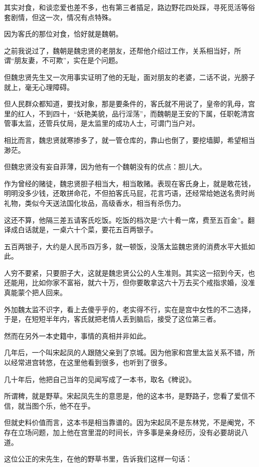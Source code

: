 \begin{multicols}{\theparacolNo}
其实对食，和谈恋爱也差不多，也有第三者插足，路边野花四处踩，寻死觅活等俗套剧情，但这一次，情况有点特殊。

因为客氏的那位对食，恰好就是魏朝。

之前我说过了，魏朝是魏忠贤的老朋友，还帮他介绍过工作，关系相当好，所谓“朋友妻，不可欺”，实在是个问题。

但魏忠贤先生又一次用事实证明了他的无耻，面对朋友的老婆，二话不说，光膀子就上，毫无心理障碍。

但人民群众都知道，要找对象，那是要条件的，客氏就不用说了，皇帝的乳母，宫里的红人，不到四十，“妖艳美貌，品行淫荡”，而魏朝是王安的下属，任职乾清宫管事太监，还管兵仗局，是太监里的成功人士，可谓门当户对。

相比而言，魏忠贤就寒掺多了，就一管仓库的，靠山也倒了，要挖墙脚，希望相当渺茫。

但魏忠贤没有妄自菲薄，因为他有一个魏朝没有的优点：胆儿大。

作为曾经的赌徒，魏忠贤胆子相当大，相当敢赌。表现在客氏身上，就是敢花钱，明明没多少钱，还敢拼命花，不但拍客氏马屁，花言巧语，还经常给她送名贵时尚礼物，类似今天送法国化妆品，高级香水，相当有杀伤力。

这还不算，他隔三差五请客氏吃饭。吃饭的档次是“六十肴一席，费至五百金”。翻译成白话就是，一桌六十个菜，要花五百两银子。

五百两银子，大约是人民币四万多，就一顿饭，没落太监魏忠贤的消费水平大抵如此。

人穷不要紧，只要胆子大，这就是魏忠贤公公的人生准则。其实这一招到今天，也还能用，比如你家不富裕，就六十万，但你要敢拿这六十万去买个戒指求婚，没准真能蒙个把人回来。

外加魏太监不识字，看上去傻乎乎的，老实得不行，实在是宫中女性的不二选择，于是，在短短半年内，客氏就把老情人丢到脑后，接受了这位第三者。

然而在另外一本史籍中，事情的真相并非如此。

几年后，一个叫宋起凤的人跟随父亲到了京城。因为他家和宫里太监关系不错，所以经常进宫转悠，在这里他看到很多，也听到了很多。

几十年后，他把自己当年的见闻写成了一本书，取名《稗说》。

所谓稗，就是野草。宋起凤先生的意思是，他的这本书，是野路子，您看了爱信不信，就当图个乐，他不在乎。

但就史料价值而言，这本书是相当靠谱的。因为宋起凤不是东林党，不是阉党，不存在立场问题，加上他在宫里混的时间长，许多事是亲身经历，没有必要胡说八道。

这位公正的宋先生，在他的野草书里，告诉我们这样一句话：


\end{multicols}
